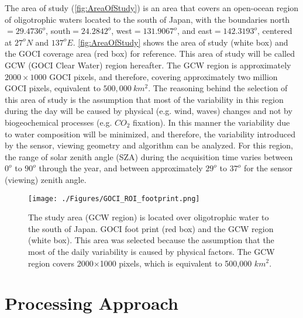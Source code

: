 \documentclass[onecolumn,3p,letterpaper,11pt]{elsarticle}
\begin{document}
The area of study (\autoref{fig:AreaOfStudy}) is an area that covers an open-ocean region of oligotrophic waters located to the south of Japan, with the boundaries north$=29.4736^o$, south$=24.2842^o$, west$=131.9067^o$, and east$=142.3193^o$, centered at $27^oN$ and $137^oE$. \autoref{fig:AreaOfStudy} shows the area of study (white box) and the GOCI coverage area (red box) for reference. This area of study will be called GCW (GOCI Clear Water) region hereafter. The GCW region is approximately $2000\times 1000$ GOCI pixels, and therefore, covering approximately two million GOCI pixels, equivalent to $500,000\ km^2$. The reasoning behind the selection of this area of study is the assumption that most of the variability in this region during the day will be caused by physical (e.g. wind, waves) changes and not by biogeochemical processes (e.g. $CO_2$ fixation). In this manner the variability due to water composition will be minimized, and therefore, the variability introduced by the sensor, viewing geometry and algorithm can be analyzed. For this region, the range of solar zenith angle (SZA) during the acquisition time  varies between $0^o$ to $90^o$ through the year, and between approximately $29^o$ to $37^o$ for the sensor (viewing) zenith angle.

\begin{figure}[ht]
\centering
\texttt{[image: ./Figures/GOCI\_ROI\_footprint.png]}
  \caption{The study area (GCW region) is located over oligotrophic water to the south of Japan. GOCI foot print (red box) and the GCW region (white box). This area was selected because the assumption that the most of the daily variability is caused by physical factors. The GCW region covers 2000$\times$1000 pixels, which is equivalent to 500,000 $km^2$.}
	\label{fig:AreaOfStudy}
\end{figure}
\section{Processing Approach}
\label{sec:processing}
\end{document}
